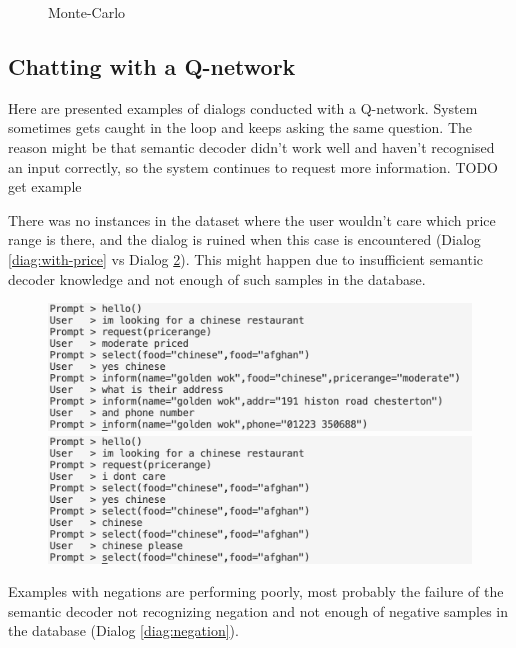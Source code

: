 \documentclass[12pt,titlepage,a4paper]{article}
\begin{document}
\begin{figure}[!htb]
      \caption{Monte-Carlo}
      \label{fig:mc}
    \endminipage
\end{figure}

\subsection{Chatting with a Q-network}
Here are presented examples of dialogs conducted with a Q-network. System sometimes gets caught in the loop and keeps asking the same question. The reason might be that semantic decoder didn't work well and haven't recog\-nised an input correctly, so the system continues to request more information. TODO get example

There was no instances in the dataset where the user wouldn't care which price range is there, and the dialog is ruined when this case is encountered (Dialog \ref{diag:with-price} vs Dialog \ref{diag:without-price}). This might happen due to insufficient semantic decoder knowledge and not enough of such samples in the database.

\begin{figure}[!htb]
      \includegraphics[width=\linewidth]{with_price.png}
      \caption{}
      \label{diag:with-price}
    \endminipage\hfill
      \includegraphics[width=\linewidth]{without_price.png}
      \caption{}
      \label{diag:without-price}
    \endminipage
\end{figure}

Examples with negations are performing poorly, most probably the failure of the semantic decoder not recognizing negation and not enough of negative samples in the database (Dialog \ref{diag:negation}).
\end{document}
